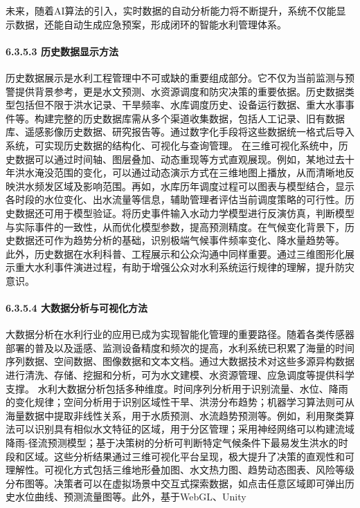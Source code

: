 未来，随着AI算法的引入，实时数据的自动分析能力将不断提升，系统不仅能显示数据，还能自动生成应急预案，形成闭环的智能水利管理体系。 \paragraph{6.3.5.3
历史数据显示方法}\label{ux5386ux53f2ux6570ux636eux663eux793aux65b9ux6cd5}
历史数据展示是水利工程管理中不可或缺的重要组成部分。它不仅为当前监测与预警提供背景参考，更是水文预测、水资源调度和防灾决策的重要依据。历史数据类型包括但不限于洪水记录、干旱频率、水库调度历史、设备运行数据、重大水事事件等。构建完整的历史数据库需从多个渠道收集数据，包括人工记录、旧有数据库、遥感影像历史数据、研究报告等。通过数字化手段将这些数据统一格式后导入系统，可实现历史数据的结构化、可视化与查询管理。
在三维可视化系统中，历史数据可以通过时间轴、图层叠加、动态重现等方式直观展现。例如，某地过去十年洪水淹没范围的变化，可以通过动态演示方式在三维地图上播放，从而清晰地反映洪水频发区域及影响范围。再如，水库历年调度过程可以图表与模型结合，显示各时段的水位变化、出水流量等信息，辅助管理者评估当前调度策略的可行性。历史数据还可用于模型验证。将历史事件输入水动力学模型进行反演仿真，判断模型与实际事件的一致性，从而优化模型参数，提高预测精度。在气候变化背景下，历史数据还可作为趋势分析的基础，识别极端气候事件频率变化、降水量趋势等。
此外，历史数据在水利科普、工程展示和公众沟通中同样重要。通过三维图形化展示重大水利事件演进过程，有助于增强公众对水利系统运行规律的理解，提升防灾意识。 \paragraph{6.3.5.4
大数据分析与可视化方法}\label{ux5927ux6570ux636eux5206ux6790ux4e0eux53efux89c6ux5316ux65b9ux6cd5}
大数据分析在水利行业的应用已成为实现智能化管理的重要路径。随着各类传感器部署的普及以及遥感、监测设备精度和频次的提高，水利系统已积累了海量的时间序列数据、空间数据、图像数据和文本文档。通过大数据技术对这些多源异构数据进行清洗、存储、挖掘和分析，可为水文建模、水资源管理、应急调度等提供科学支撑。
水利大数据分析包括多种维度。时间序列分析用于识别流量、水位、降雨的变化规律；空间分析用于识别区域性干旱、洪涝分布趋势；机器学习算法则可从海量数据中提取非线性关系，用于水质预测、水流趋势预测等。例如，利用聚类算法可以识别具有相似水文特征的区域，用于分区管理；采用神经网络可以构建流域降雨-径流预测模型；基于决策树的分析可判断特定气候条件下最易发生洪水的时段和区域。这些分析结果通过三维可视化平台呈现，极大提升了决策的直观性和可理解性。可视化方式包括三维地形叠加图、水文热力图、趋势动态图表、风险等级分布图等。决策者可以在虚拟场景中交互式探索数据，如点击任意区域即可弹出历史水位曲线、预测流量图等。此外，基于WebGL、Unity
